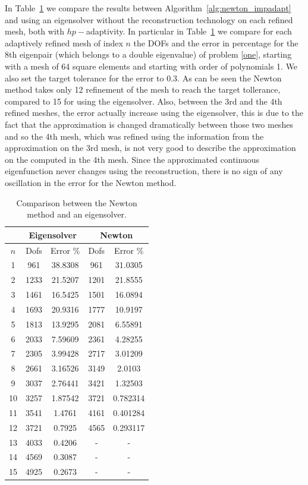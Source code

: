 \documentclass[preprint,12pt]{elsarticle}
\begin{document}
In Table~\ref{tab:rec} we compare the results between Algorithm~\ref{alg:newton_impadapt} and using an eigensolver without the reconstruction technology on each refined mesh, both with $hp-$adaptivity. In particular in Table~\ref{tab:rec} we compare for each adaptively refined mesh of index $n$ the DOFs and the error in percentage for the 8th eigenpair (which belongs to a double eigenvalue) of problem \eqref{one}, starting with a mesh of 64 square elements and starting with order of polynomials 1. We also set the target tolerance for the error to 0.3.
As can be seen the Newton method takes only 12 refinement of the mesh to reach the target tollerance, compared to 15 for using the eigensolver. Also, between the 3rd and the 4th refined meshes, the error actually increase  using the eigensolver, this is due to the fact that the approximation is changed dramatically between those two meshes and so the 4th mesh, which was refined using the information from the approximation on the 3rd mesh, is not very good to describe the approximation on the computed in the 4th mesh. Since the approximated continuous eigenfunction never changes using the reconstruction, there is no sign of any oscillation in the error for the Newton method.

\begin{table}[h]
\begin{center}

\begin{tabular}{|c|c|c|c|c|}
\hline
&\multicolumn{2}{|c|}{Eigensolver}&\multicolumn{2}{|c|}{Newton}\\
\hline
$n$ &  Dofs & Error \% &Dofs & Error \%\\
\hline
1 & 961 & 38.8308 & 961 & 31.0305 \\
\hline
2 & 1233 & 21.5207 & 1201 & 21.8555\\
\hline
3 & 1461 & 16.5425 & 1501 & 16.0894\\
\hline
4 & 1693 & 20.9316 & 1777 & 10.9197\\
\hline
5 & 1813 & 13.9295 & 2081 & 6.55891\\
\hline
6 & 2033 & 7.59609 & 2361 &4.28255\\
\hline
7 &2305 & 3.99428 & 2717 & 3.01209\\
\hline
8 & 2661 & 3.16526 &3149 & 2.0103\\
\hline
9 & 3037 & 2.76441 & 3421 & 1.32503\\
\hline
10 & 3257 & 1.87542 &3721 &0.782314\\
\hline
11 & 3541 &1.4761 & 4161 & 0.401284\\
\hline
12 & 3721 & 0.7925 & 4565 & 0.293117\\
\hline
13 & 4033 & 0.4206 & - & - \\
\hline
14 & 4569 & 0.3087 & - & - \\
\hline
15 & 4925 & 0.2673 & - & -\\
\hline
\end{tabular}
\end{center}

\caption{Comparison between the Newton method and an eigensolver. }\label{tab:rec}
\end{table}
\end{document}
